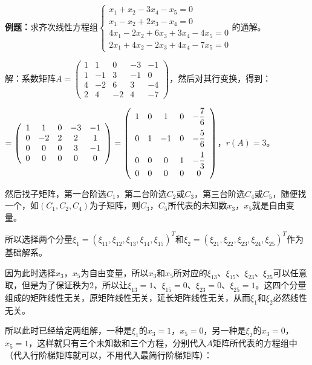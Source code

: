 \textbf{例题：}求齐次线性方程组$\left\{\begin{array}{l}
    x_1+x_2-3x_4-x_5=0 \\
    x_1-x_2+2x_3-x_4=0 \\
    4x_1-2x_2+6x_3+3x_4-4x_5=0 \\
    2x_1+4x_2-2x_3+4x_4-7x_5=0
\end{array}\right.$的通解。

解：系数矩阵$A=\left(\begin{array}{ccccc}
    1 & 1 & 0 & -3 & -1 \\
    1 & -1 & 3 & -1 & 0 \\
    4 & -2 & 6 & 3 & -4 \\
    2 & 4 & -2 & 4 & -7
\end{array}\right)$，然后对其行变换，得到：

$=\left(\begin{array}{ccccc}
    1 & 1 & 0 & -3 & -1 \\
    0 & -2 & 2 & 2 & 1 \\
    0 & 0 & 0 & 3 & -1 \\
    0 & 0 & 0 & 0 & 0
\end{array}\right)=\left(\begin{array}{ccccc}
    1 & 0 & 1 & 0 & -\dfrac{7}{6} \medskip \\
    0 & 1 & -1 & 0 & -\dfrac{5}{6} \medskip \\
    0 & 0 & 0 & 1 & -\dfrac{1}{3} \\
    0 & 0 & 0 & 0 & 0
\end{array}\right)$，$r(A)=3$。

然后找子矩阵，第一台阶选$C_1$，第二台阶选$C_2$或$C_3$，第三台阶选$C_4$或$C_5$，随便找一个，如$(C_1,C_2,C_4)$为子矩阵，则$C_3$，$C_5$所代表的未知数$x_3$，$x_5$就是自由变量。

所以选择两个分量$\xi_1=(\xi_{11},\xi_{12},\xi_{13},\xi_{14},\xi_{15})^T$和$\xi_2=(\xi_{21},\xi_{22},\xi_{23},\xi_{24},\xi_{25})^T$作为基础解系。

因为此时选择$x_3$，$x_5$为自由变量，所以$x_3$和$x_5$所对应的$\xi_{13}$、$\xi_{15}$、$\xi_{23}$、$\xi_{25}$可以任意取，但是为了保证秩为2，所以让$\xi_{13}=1$、$\xi_{15}=0$、$\xi_{23}=0$、$\xi_{25}=1$。这四个分量组成的矩阵线性无关，原矩阵线性无关，延长矩阵线性无关，从而$\xi_1$和$\xi_2$必然线性无关。

所以此时已经给定两组解，一种是$\xi_1$的$x_3=1$，$x_5=0$，另一种是$\xi_2$的$x_3=0$，$x_5=1$，这样就只有三个未知数和三个方程，分别代入$A$矩阵所代表的方程组中（代入行阶梯矩阵就可以，不用代入最简行阶梯矩阵）：

